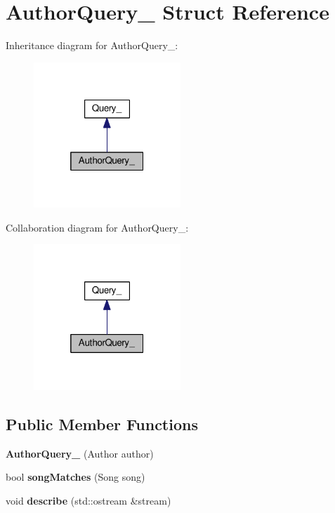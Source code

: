 \hypertarget{struct_author_query__}{}\section{Author\+Query\+\_\+ Struct Reference}
\label{struct_author_query__}


Inheritance diagram for Author\+Query\+\_\+\+:
\nopagebreak
\begin{figure}[H]
\begin{center}
\leavevmode
\includegraphics[width=157pt]{struct_author_query____inherit__graph}
\end{center}
\end{figure}


Collaboration diagram for Author\+Query\+\_\+\+:
\nopagebreak
\begin{figure}[H]
\begin{center}
\leavevmode
\includegraphics[width=157pt]{struct_author_query____coll__graph}
\end{center}
\end{figure}
\subsection*{Public Member Functions}
\begin{DoxyCompactItemize}
\item 
{\bfseries Author\+Query\+\_\+} (Author author)\hypertarget{struct_author_query___a0279677078b9bb7249517685e3cecd78}{}\label{struct_author_query___a0279677078b9bb7249517685e3cecd78}

\item 
bool {\bfseries song\+Matches} (Song song)\hypertarget{struct_author_query___a1af9eddcf0349da56c8d23ddc7d055e4}{}\label{struct_author_query___a1af9eddcf0349da56c8d23ddc7d055e4}

\item 
void {\bfseries describe} (std\+::ostream \&stream)\hypertarget{struct_author_query___ac336376312ac5ea5c3686237b7c021b9}{}\label{struct_author_query___ac336376312ac5ea5c3686237b7c021b9}

\end{DoxyCompactItemize}


